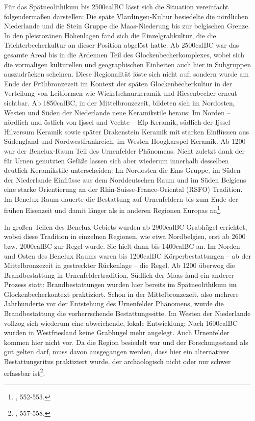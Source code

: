\documentclass[openany,twoside,twocolumn]{book}
\let\rmarkdownfootnote\footnote%
\def\footnote{\protect\rmarkdownfootnote}
\begin{document}
Für das Spätneolithikum bis 2500calBC lässt sich die Situation
vereinfacht folgendermaßen darstellen: Die späte Vlardingen-Kultur
besiedelte die nördlichen Niederlande und die Stein Gruppe die
Maas-Niederung bis zur belgischen Grenze. In den pleistozänen Höhenlagen
fand sich die Einzelgrabkultur, die die Trichterbecherkultur an dieser
Position abgelöst hatte. Ab 2500calBC war das gesamte Areal bis in die
Ardennen Teil des Glockenbecherkomplexes, wobei sich die vormaligen
kulturellen und geographischen Einheiten auch hier in Subgruppen
auszudrücken scheinen. Diese Regionalität löste sich nicht auf, sondern
wurde am Ende der Frühbronzezeit im Kontext der späten
Glockenbecherkultur in der Verteilung von Leitformen wie
Wickelschnurkeramik und Riesenbecher erneut sichtbar. Ab 1850calBC, in
der Mittelbronzezeit, bildeten sich im Nordosten, Westen und Süden der
Niederlande neue Keramikstile heraus: Im Norden -- nördlich und östlich
von Ijssel und Vechte -- Elp Keramik, südlich der Ijssel Hilversum
Keramik sowie später Drakenstein Keramik mit starken Einflüssen aus
Südengland und Nordwestfrankreich, im Westen Hoogkarspel Keramik. Ab
1200 war der Benelux-Raum Teil des Urnenfelder Phänomens. Nicht zuletzt
dank der für Urnen genutzten Gefäße lassen sich aber wiederum innerhalb
desselben deutlich Keramikstile unterscheiden: Im Nordosten die Ems
Gruppe, im Süden der Niederlande Einflüsse aus dem Norddeutschen Raum
und im Süden Belgiens eine starke Orientierung an der
Rhin-Suisse-France-Oriental (RSFO) Tradition. Im Benelux Raum dauerte
die Bestattung auf Urnenfeldern bis zum Ende der frühen Eisenzeit und
damit länger als in anderen Regionen Europas an\footnote{\textcite{fokkens_bronze_2013},
  552-553.}.

In großen Teilen des Benelux Gebiets wurden ab 2900calBC Grabhügel
errichtet, wobei diese Tradition in einzelnen Regionen, wie etwa
Nordbelgien, erst ab 2600 bzw. 2000calBC zur Regel wurde. Sie hielt dann
bis 1400calBC an. Im Norden und Osten des Benelux Raums waren bis
1200calBC Körperbestattungen -- ab der Mittelbronzezeit in gestreckter
Rückenlage -- die Regel. Ab 1200 überwog die Brandbestattung in
Urnenfeldertradition. Südlich der Maas fand ein anderer Prozess statt:
Brandbestattungen wurden hier bereits im Spätneolithikum im
Glockenbecherkontext praktiziert. Schon in der Mittelbronzezeit, also
mehrere Jahrhunderte vor der Entstehung des Urnenfelder Phänomens, wurde
die Brandbestattung die vorherrschende Bestattungssitte. Im Westen der
Niederlande vollzog sich wiederum eine abweichende, lokale Entwicklung:
Nach 1600calBC wurden in Westfriesland keine Grabhügel mehr angelegt.
Auch Urnenfelder kommen hier nicht vor. Da die Region besiedelt war und
der Forschungsstand als gut gelten darf, muss davon ausgegangen werden,
dass hier ein alternativer Bestattungsritus praktiziert wurde, der
archäologisch nicht oder nur schwer erfassbar ist\footnote{\textcite{fokkens_bronze_2013},
  557-558.}.
\end{document}
